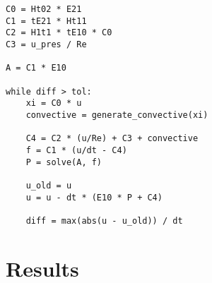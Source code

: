 \documentclass[a4paper,10pt,parskip=half]{scrreprt}
\begin{document}
\begin{lstlisting}[caption=Optimized implementation, label=lst:naive]
C0 = Ht02 * E21
C1 = tE21 * Ht11
C2 = H1t1 * tE10 * C0
C3 = u_pres / Re

A = C1 * E10

while diff > tol:
    xi = C0 * u
    convective = generate_convective(xi)
    
    C4 = C2 * (u/Re) + C3 + convective
    f = C1 * (u/dt - C4)
    P = solve(A, f)
    
    u_old = u
    u = u - dt * (E10 * P + C4)
    
    diff = max(abs(u - u_old)) / dt
\end{lstlisting}

\chapter{Results}


\end{document}
